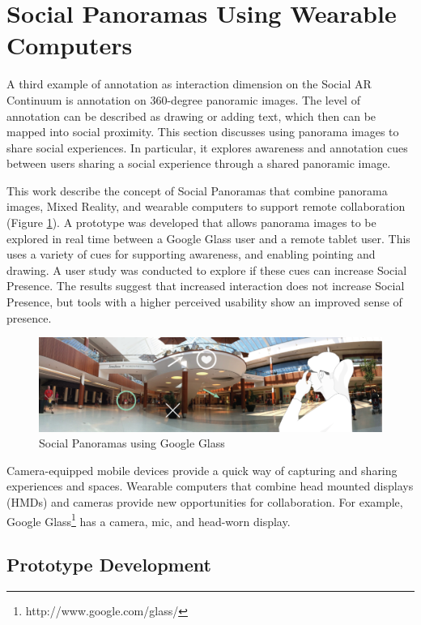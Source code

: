 \section{Social Panoramas Using Wearable Computers}
\label{sec:pano}

A third example of annotation as interaction dimension on the Social AR Continuum is annotation on 360-degree panoramic images. The level of annotation can be described as drawing or adding text, which then can be mapped into social proximity. This section discusses using panorama images to share social experiences. In particular, it explores awareness and annotation cues between users sharing a social experience through a shared panoramic image.

This work describe the concept of Social Panoramas that combine panorama images, Mixed Reality, and wearable computers to support remote collaboration \cite{Reichherzer2014, Billinghurst2014} (Figure \ref{fig:ismar14:concept}). A prototype was developed that allows panorama images to be explored in real time between a Google Glass user and a remote tablet user. This uses a variety of cues for supporting awareness, and enabling pointing and drawing. A user study was conducted to explore if these cues can increase Social Presence. The results suggest that increased interaction does not increase Social Presence, but tools with a higher perceived usability show an improved sense of presence.

\begin{figure}[ht]
	\centering
	\includegraphics[width=\linewidth]{images/ismar14/concept}
	\caption{Social Panoramas using Google Glass}
	\label{fig:ismar14:concept}
\end{figure}

Camera-equipped mobile devices provide a quick way of capturing and sharing experiences and spaces. Wearable computers that combine head mounted displays (HMDs) and cameras provide new opportunities for collaboration. For example, Google Glass\footnote{http://www.google.com/glass/} has a camera, mic, and head-worn display.


\subsection{Prototype Development}

